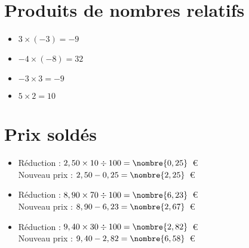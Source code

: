 \documentclass[a4paper,11pt,fleqn]{article}		%
\begin{document}
\section{Produits de nombres relatifs}
\begin{itemize}

  \item $3\times(-3)=-9$
  \item $-4\times(-8)=32$
  \item $-3\times3=-9$
  \item $5\times2=10$
\end{itemize}

\section{Prix soldés}
\begin{itemize}

  \item Réduction : $2,50\times10\div100=\nombre{0,25}$~€\\
  Nouveau prix : $2,50-0,25=\nombre{2,25}$~€
  \item Réduction : $8,90\times70\div100=\nombre{6,23}$~€\\
  Nouveau prix : $8,90-6,23=\nombre{2,67}$~€
  \item Réduction : $9,40\times30\div100=\nombre{2,82}$~€\\
  Nouveau prix : $9,40-2,82=\nombre{6,58}$~€
\end{itemize}
\end{document}
